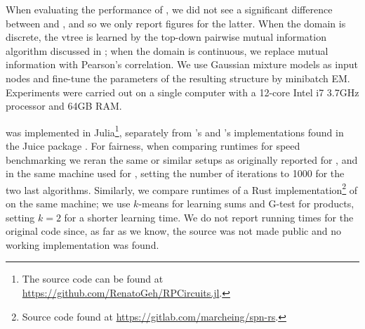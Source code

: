 When evaluating the performance of , we did not see a significant difference
between  and , and so we only report figures for the latter.
When the domain is discrete, the vtree is learned by the top-down pairwise mutual information
algorithm discussed in ; when the domain is continuous, we replace mutual
information with Pearson's correlation. We use Gaussian mixture models as input nodes and fine-tune
the parameters of the resulting structure by minibatch EM. Experiments were carried out on a
single computer with a 12-core Intel i7 3.7GHz processor and 64GB RAM.

 was implemented in Julia\footnote{The source code can be found at
\url{https://github.com/RenatoGeh/RPCircuits.jl}.}, separately from 's and
's implementations found in the Juice package \citep{dang21}. For fairness,
when comparing runtimes for speed benchmarking we reran the same or similar setups as originally
reported for ,  and  in the same machine used
for , setting the number of iterations to 1000 for the two last \incrclass{}
algorithms. Similarly, we compare runtimes of a Rust implementation\footnote{Source code found at
\url{https://gitlab.com/marcheing/spn-rs}.} of  on the same machine; we use
$k$-means for learning sums and G-test for products, setting $k=2$ for a shorter learning time. We
do not report running times for the original  code since, as far as we know,
the source was not made public and no working implementation was found.

